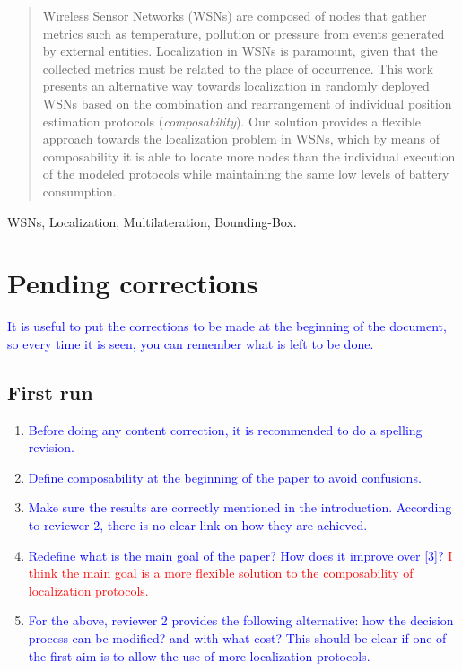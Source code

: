 \documentclass[conference]{IEEEtran}
\begin{document}
\begin{abstract}
\boldmath Wireless Sensor Networks (WSNs) are composed of nodes that gather metrics such as temperature, pollution or pressure from events generated by external entities. Localization in WSNs is paramount, given that the collected metrics must be related to the place of occurrence. This work presents an alternative way towards localization in randomly deployed WSNs based on the combination and rearrangement of individual position estimation protocols (\emph{composability}). Our solution provides a flexible approach towards the localization problem in WSNs, which by means of composability it is able to locate more nodes than the individual execution of the modeled protocols while maintaining the same low levels of battery consumption.


\end{abstract}

\begin{IEEEkeywords}
WSNs, Localization, Multilateration, Bounding-Box.
\end{IEEEkeywords}

\section{Pending corrections}
\textcolor{blue}{It is useful to put the corrections to be made at the beginning of the document, so every time it is seen, you can remember what is left to be done.}

\subsection{First run}
\begin{enumerate}
	\item\textcolor{blue}{Before doing any content correction, it is recommended to do a spelling revision.}
	\item\textcolor{blue}{Define composability at the beginning of the paper to avoid confusions.}
	\item\textcolor{blue}{Make sure the results are correctly mentioned in the introduction. According to reviewer 2, there is no clear link on how they are achieved.}
	\item\textcolor{blue}{Redefine what is the main goal of the paper? How does it improve over [3]?} \textcolor{red}{I think the main goal is a more flexible solution to the composability of localization protocols.}
	\item\textcolor{blue}{For the above, reviewer 2 provides the following alternative: how the decision process can be modified? and with what cost? This should be clear if one of the first aim is to allow the use of more localization protocols.}
	
\end{enumerate}
\end{document}
